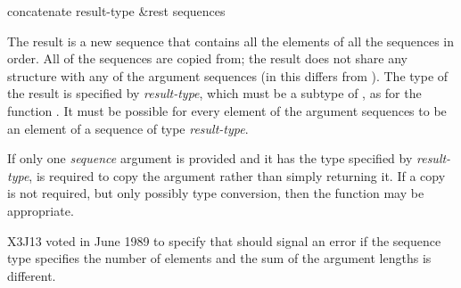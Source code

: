 \begin{defun}[Function]
concatenate result-type &rest sequences

The result is a new sequence that contains all the elements of all the
sequences in order.  All of the sequences are copied from; the result
does not share any structure with any of the argument sequences (in this
 differs from ).  The type of the result is
specified by \emph{result-type}, which must be a subtype of ,
as for the function .
It must be possible for every element of the argument sequences to be an
element of a sequence of type \emph{result-type}.

If only one \emph{sequence} argument is provided
and it has the type specified by \emph{result-type},
 is required to copy the argument rather than simply
returning it.  If a copy is not required, but only possibly type conversion,
then the  function may be appropriate.

\begin{newer}
X3J13 voted in June 1989  to specify that
 should signal an error if the sequence type specifies the
number of elements and the sum of the argument lengths is different.
\end{newer}
\end{defun}

